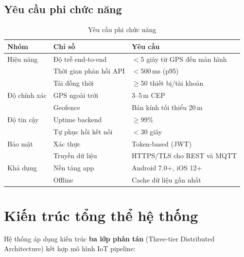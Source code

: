 \subsection{Yêu cầu phi chức năng}

\begin{table}[H]
\centering
\caption{Yêu cầu phi chức năng}
\label{tab:nonfunctional}
\begin{tabularx}{\textwidth}{l l X}
\toprule
\textbf{Nhóm} & \textbf{Chỉ số} & \textbf{Yêu cầu} \\
\midrule
Hiệu năng & Độ trễ end-to-end & $<$5 giây từ GPS đến màn hình \\
          & Thời gian phản hồi API & $<$500\,ms (p95) \\
          & Tải đồng thời & $\geq$50 thiết bị/tài khoản \\
\midrule
Độ chính xác & GPS ngoài trời & 3--5\,m CEP \\
             & Geofence & Bán kính tối thiểu 20\,m \\
\midrule
Độ tin cậy & Uptime backend & $\geq$99\% \\
           & Tự phục hồi kết nối & $<$30 giây \\
\midrule
Bảo mật & Xác thực & Token-based (JWT) \\
        & Truyền dữ liệu & HTTPS/TLS cho REST và MQTT \\
\midrule
Khả dụng & Nền tảng app & Android 7.0+, iOS 12+ \\
         & Offline & Cache dữ liệu gần nhất \\
\bottomrule
\end{tabularx}
\end{table}

\section{Kiến trúc tổng thể hệ thống}

Hệ thống áp dụng kiến trúc \textbf{ba lớp phân tán} (Three-tier Distributed Architecture) kết hợp mô hình IoT pipeline:

